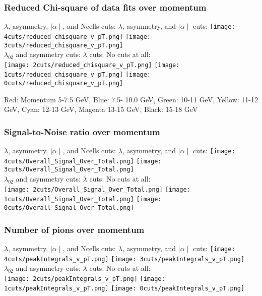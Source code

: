 \documentclass{beamer}
\begin{document}
\frame
{
\frametitle{Reduced Chi-square of data fits over momentum}
$\lambda$, asymmetry, $\mid\alpha\mid$, and Ncells cuts:
$\lambda$, asymmetry, and $\mid\alpha\mid$ cuts:
\texttt{[image: 4cuts/reduced\_chisquare\_v\_pT.png]}
\noindent\hspace{3 cm}\texttt{[image: 3cuts/reduced\_chisquare\_v\_pT.png]}\\
$\lambda_{02}$ and asymmetry cuts:
$\lambda$ cuts:
\noindent\hspace{2 cm} No cuts at all:\\
\texttt{[image: 2cuts/reduced\_chisquare\_v\_pT.png]}
\texttt{[image: 1cuts/reduced\_chisquare\_v\_pT.png]}
\texttt{[image: 0cuts/reduced\_chisquare\_v\_pT.png]}
}

\frame %
{
Red: Momentum 5-7.5 GeV, Blue: 7.5- 10.0 GeV, Green: 10-11 GeV, Yellow: 11-12 GeV, Cyan: 12-13 GeV, Magenta 13-15 GeV, Black: 15-18 GeV\\
\frametitle{Signal-to-Noise ratio over momentum}
$\lambda$, asymmetry, $\mid\alpha\mid$, and Ncells cuts:
$\lambda$, asymmetry, and $\mid\alpha\mid$ cuts:
\texttt{[image: 4cuts/Overall\_Signal\_Over\_Total.png]}
\noindent\hspace{3 cm}\texttt{[image: 3cuts/Overall\_Signal\_Over\_Total.png]}\\
$\lambda_{02}$ and asymmetry cuts:
$\lambda$ cuts:
\noindent\hspace{2 cm} No cuts at all:\\
\texttt{[image: 2cuts/Overall\_Signal\_Over\_Total.png]}
\texttt{[image: 1cuts/Overall\_Signal\_Over\_Total.png]}
\texttt{[image: 0cuts/Overall\_Signal\_Over\_Total.png]}
}

\frame %
{
\frametitle{Number of pions over momentum}
$\lambda$, asymmetry, $\mid\alpha\mid$, and Ncells cuts:
$\lambda$, asymmetry, and $\mid\alpha\mid$ cuts:
\texttt{[image: 4cuts/peakIntegrals\_v\_pT.png]}
\noindent\hspace{3 cm}\texttt{[image: 3cuts/peakIntegrals\_v\_pT.png]}\\
$\lambda_{02}$ and asymmetry cuts:
$\lambda$ cuts:
\noindent\hspace{2 cm} No cuts at all:\\
\texttt{[image: 2cuts/peakIntegrals\_v\_pT.png]}
\texttt{[image: 1cuts/peakIntegrals\_v\_pT.png]}
\texttt{[image: 0cuts/peakIntegrals\_v\_pT.png]}
}
\end{document}
